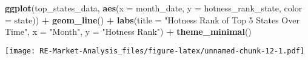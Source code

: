 \documentclass[
]{article}
\newenvironment{Shaded}{\begin{snugshade}}{\end{snugshade}}
\newcommand{\AttributeTok}[1]{\textcolor[rgb]{0.13,0.29,0.53}{#1}}
\newcommand{\FunctionTok}[1]{\textcolor[rgb]{0.13,0.29,0.53}{\textbf{#1}}}
\newcommand{\NormalTok}[1]{#1}
\newcommand{\SpecialCharTok}[1]{\textcolor[rgb]{0.81,0.36,0.00}{\textbf{#1}}}
\newcommand{\StringTok}[1]{\textcolor[rgb]{0.31,0.60,0.02}{#1}}
\begin{document}
\begin{Shaded}
\begin{Highlighting}[]
\FunctionTok{ggplot}\NormalTok{(top\_states\_data, }\FunctionTok{aes}\NormalTok{(}\AttributeTok{x =}\NormalTok{ month\_date, }\AttributeTok{y =}\NormalTok{ hotness\_rank\_state, }\AttributeTok{color =}\NormalTok{ state)) }\SpecialCharTok{+}
  \FunctionTok{geom\_line}\NormalTok{() }\SpecialCharTok{+}
  \FunctionTok{labs}\NormalTok{(}\AttributeTok{title =} \StringTok{"Hotness Rank of Top 5 States Over Time"}\NormalTok{,}
       \AttributeTok{x =} \StringTok{"Month"}\NormalTok{, }\AttributeTok{y =} \StringTok{"Hotness Rank"}\NormalTok{) }\SpecialCharTok{+}
  \FunctionTok{theme\_minimal}\NormalTok{()}
\end{Highlighting}
\end{Shaded}

\texttt{[image: RE-Market-Analysis\_files/figure-latex/unnamed-chunk-12-1.pdf]}
\end{document}

